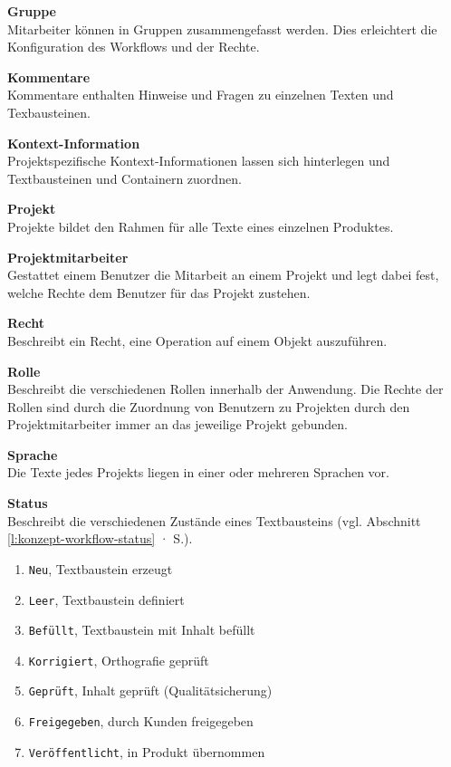 \textsf{\textbf{Gruppe}}\\Mitarbeiter können in Gruppen zusammengefasst werden. Dies erleichtert die Konfiguration des Workflows und der Rechte.

\textsf{\textbf{Kommentare}}\\Kommentare enthalten Hinweise und Fragen zu einzelnen Texten und Texbausteinen.

\textsf{\textbf{Kontext-Information}}\\Projektspezifische Kontext-Informationen lassen sich hinterlegen und Textbausteinen und Containern zuordnen.

\textsf{\textbf{Projekt}}\\Projekte bildet den Rahmen für alle Texte eines einzelnen Produktes.

\textsf{\textbf{Projektmitarbeiter}}\\Gestattet einem Benutzer die Mitarbeit an einem Projekt und legt dabei fest, welche Rechte dem Benutzer für das Projekt zustehen.

\textsf{\textbf{Recht}}\\Beschreibt ein Recht, eine Operation auf einem Objekt auszuführen.

\textsf{\textbf{Rolle}}\\Beschreibt die verschiedenen Rollen innerhalb der Anwendung. Die Rechte der Rollen sind durch die Zuordnung von Benutzern zu Projekten durch den Projektmitarbeiter immer an das jeweilige Projekt gebunden.

\textsf{\textbf{Sprache}}\\Die Texte jedes Projekts liegen in einer oder mehreren Sprachen vor.

\textsf{\textbf{Status}}\\Beschreibt die verschiedenen Zustände eines Textbausteins (vgl. Abschnitt \ref{l:konzept-workflow-status} · S.\pageref{l:konzept-workflow-status}).

\begin{enumerate}\itemsep -5pt
\item \texttt{Neu}, Textbaustein erzeugt
\item \texttt{Leer}, Textbaustein definiert
\item \texttt{Befüllt}, Textbaustein mit Inhalt befüllt
\item \texttt{Korrigiert}, Orthografie geprüft
\item \texttt{Geprüft}, Inhalt geprüft (Qualitätsicherung)
\item \texttt{Freigegeben}, durch Kunden freigegeben
\item \texttt{Veröffentlicht}, in Produkt übernommen
\end{enumerate}

